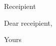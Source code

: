\documentclass{scrlttr2}%
\begin{document}
\begin{letter}{Receipient}
  \opening{Dear receipient,}
  \lipsum[1-2]
  \pagebreak %
  \lipsum[3-12]
  \closing{Yours}
\end{letter}
\end{document}
